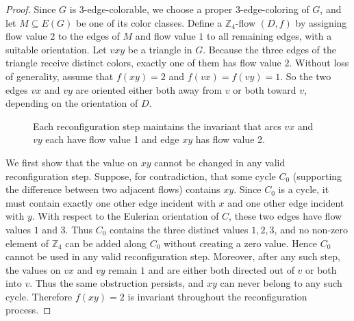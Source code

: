 \documentclass[a4paper,12pt]{article}
\theoremstyle{plain}
\theoremstyle{definition}
\begin{document}
\begin{proof}
Since $G$ is $3$-edge-colorable, we choose a proper $3$-edge-coloring of $G$, and let $M \subseteq E(G)$ be one of its color classes. 
Define a $\mathbb Z_4$-flow $(D,f)$ by assigning flow value $2$ to the edges of $M$ and flow value $1$ to all remaining edges, with a suitable orientation. Let $vxy$ be a triangle in $G$. 
Because the three edges of the triangle receive distinct colors, exactly one of them has flow value $2$.  
Without loss of generality, assume that $f(xy)=2$ and $f(vx)=f(vy)=1$. 
So the two edges $vx$ and $vy$ are oriented either both away from $v$ or both toward $v$, 
depending on the orientation of $D$.

\begin{figure}[!h]
\centering
{}
	\captionsetup{width=.72\textwidth}
	\caption{Each reconfiguration step maintains the invariant that arcs $vx$ and $vy$ each have flow value 1
and edge $xy$ has flow value 2.}
\end{figure}


We first show that the value on $xy$ cannot be changed in any valid reconfiguration step. 
Suppose, for contradiction, that some cycle $C_0$ (supporting the difference between two adjacent flows) contains $xy$. Since $C_0$ is a cycle, it must contain exactly one other edge incident with $x$ and one other edge incident with $y$.  With respect to the Eulerian orientation of $C$, these two edges have flow values $1$ and $3$. 
Thus $C_0$ contains the three distinct values $1,2,3$, and no non-zero element of $\mathbb Z_4$ can be added along $C_0$ without creating a zero value. Hence $C_0$ cannot be used in any valid reconfiguration step. 
Moreover, after any such step, the values on $vx$ and $vy$ remain $1$ and are either both directed out of $v$ or both into $v$. 
Thus the same obstruction persists, and $xy$ can never belong to any such cycle. 
Therefore $f(xy)=2$ is invariant throughout the reconfiguration process.


\end{proof}
\end{document}
